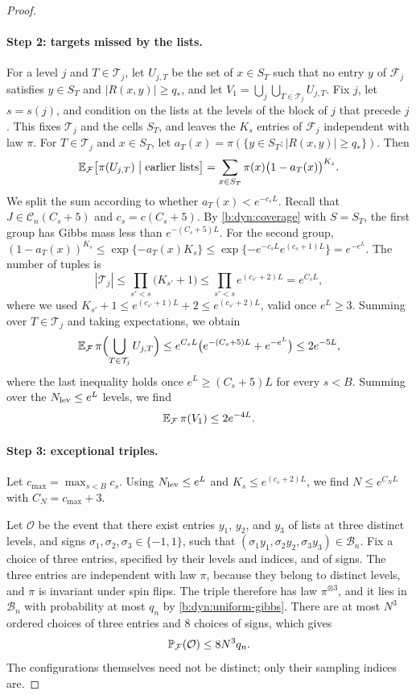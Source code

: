 \begin{proof}
\paragraph{Step 2: targets missed by the lists.}
For a level $j$ and $T\in\mathcal T_j$, let $U_{j,T}$ be the set of
$x\in S_T$ such that no entry $y$ of $\mathcal F_j$ satisfies $y\in S_T$ and
$|R(x,y)|\ge q_*$, and let $V_1=\bigcup_j\bigcup_{T\in\mathcal T_j}
U_{j,T}$. Fix $j$, let $s=s(j)$, and condition on the lists at the levels of
the block of $j$ that precede $j$. This fixes $\mathcal T_j$ and the cells
$S_T$, and leaves the $K_s$ entries of $\mathcal F_j$ independent with law
$\pi$. For $T\in\mathcal T_j$ and $x\in S_T$, let
$a_T(x)=\pi(\{y\in S_T:|R(x,y)|\ge q_*\})$. Then
\[
 \mathbb E_{\mathcal F}\bigl[\pi(U_{j,T})\bigm|\text{earlier lists}\bigr]
 =\sum_{x\in S_T}\pi(x)\bigl(1-a_T(x)\bigr)^{K_s}.
\]
We split the sum according to whether $a_T(x)<e^{-c_sL}$. Recall that
$J\in\mathcal C_n(C_s+5)$ and $c_s=c(C_s+5)$. By \eqref{b:dyn:coverage} with
$S=S_T$, the first group has Gibbs mass less than $e^{-(C_s+5)L}$. For the
second group, $(1-a_T(x))^{K_s}\le\exp\{-a_T(x)K_s\}\le
\exp\{-e^{-c_sL}e^{(c_s+1)L}\}=e^{-e^L}$. The number of tuples is
\[
 |\mathcal T_j|\le\prod_{s'<s}\bigl(K_{s'}+1\bigr)
 \le\prod_{s'<s}e^{(c_{s'}+2)L}=e^{C_sL},
\]
where we used $K_{s'}+1\le e^{(c_{s'}+1)L}+2\le e^{(c_{s'}+2)L}$, valid
once $e^L\ge3$. Summing over $T\in\mathcal T_j$ and taking expectations, we
obtain
\[
 \mathbb E_{\mathcal F}\,\pi\Bigl(\bigcup_{T\in\mathcal T_j}U_{j,T}\Bigr)
 \le e^{C_sL}\bigl(e^{-(C_s+5)L}+e^{-e^L}\bigr)\le2e^{-5L},
\]
where the last inequality holds once $e^L\ge(C_s+5)L$ for every $s<B$.
Summing over the $N_{\rm lev}\le e^L$ levels, we find
\begin{equation}\label{eq:ref-miss-mass}
 \mathbb E_{\mathcal F}\,\pi(V_1)\le2e^{-4L}.
\end{equation}

\paragraph{Step 3: exceptional triples.}
Let $c_{\max}=\max_{s<B}c_s$. Using $N_{\rm lev}\le e^L$ and
$K_s\le e^{(c_s+2)L}$, we find $N\le e^{C_NL}$ with $C_N=c_{\max}+3$.

Let $\mathcal O$ be the event that there exist entries $y_1$, $y_2$, and
$y_3$ of lists at three distinct levels, and signs
$\sigma_1,\sigma_2,\sigma_3\in\{-1,1\}$, such that
$(\sigma_1y_1,\sigma_2y_2,\sigma_3y_3)\in\mathcal B_n$. Fix a choice of three entries, specified by their levels and
indices, and of signs. The three entries are independent with law $\pi$,
because they belong to distinct levels, and $\pi$ is invariant under spin
flips. The triple therefore has law $\pi^{\otimes3}$, and it lies in
$\mathcal B_n$ with probability at most $q_n$ by
\eqref{b:dyn:uniform-gibbs}. There are at most $N^3$ ordered choices of
three entries and $8$ choices of signs, which gives
\[
 \mathbb P_{\mathcal F}(\mathcal O)\le8N^3q_n .
\]
The configurations themselves need not be distinct; only their sampling
indices are.


\end{proof}
